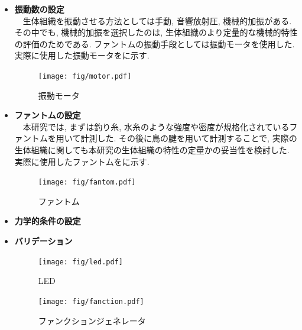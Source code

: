 \begin{itemize}
\item{\bf 振動数の設定}
\\\ \ 生体組織を振動させる方法としては手動, 音響放射圧, 機械的加振がある. その中でも, 機械的加振を選択したのは, 生体組織のより定量的な機械的特性の評価のためである. ファントムの振動手段としては振動モータを使用した. 実際に使用した振動モータをに示す.
\begin{figure}[H]
  \begin{center}
    \texttt{[image: fig/motor.pdf]}
  \end{center}
  \caption{振動モータ}
\end{figure}
\item{\bf ファントムの設定}
\\\ \ 本研究では, まずは釣り糸, 水糸のような強度や密度が規格化されているファントムを用いて計測した. その後に鳥の腱を用いて計測することで, 実際の生体組織に関しても本研究の生体組織の特性の定量かの妥当性を検討した. 実際に使用したファントムをに示す.
\begin{figure}[H]
  \begin{center}
    \texttt{[image: fig/fantom.pdf]}
  \end{center}
  \caption{ファントム}
\end{figure}
\item{\bf 力学的条件の設定}
\item{\bf バリデーション}
\begin{figure}[H]
 \begin{minipage}{0.5\hsize}
  \begin{center}
   \texttt{[image: fig/led.pdf]}
  \end{center}
  \caption{LED}
 \end{minipage}
 \begin{minipage}{0.5\hsize}
 \begin{center}
  \texttt{[image: fig/fanction.pdf]}
 \end{center}
  \caption{ファンクションジェネレータ }
 \end{minipage}
\end{figure}
\end{itemize}